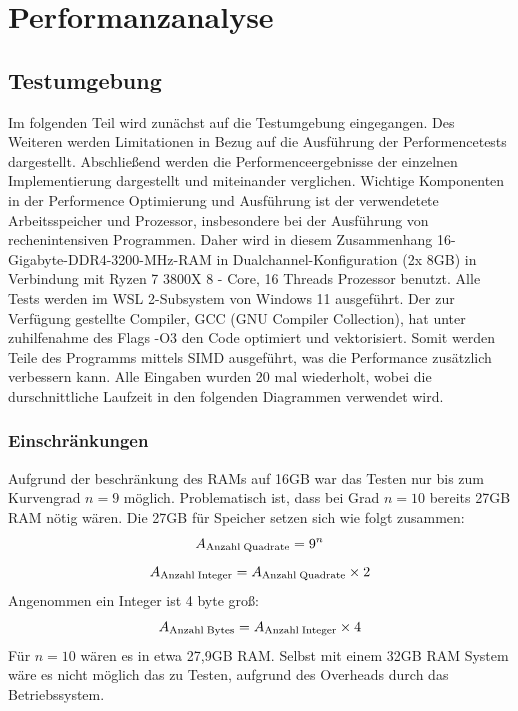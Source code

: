 \documentclass[course=erap]{aspdoc}
\begin{document}
\section{Performanzanalyse}

\subsection{Testumgebung}
Im folgenden Teil wird zunächst auf die Testumgebung eingegangen. Des Weiteren werden Limitationen in Bezug auf die Ausführung der Performencetests dargestellt. Abschließend werden die Performenceergebnisse der einzelnen Implementierung dargestellt und miteinander verglichen. Wichtige Komponenten in der Performence Optimierung und Ausführung ist der verwendetete Arbeitsspeicher und Prozessor, insbesondere bei der Ausführung von rechenintensiven Programmen. Daher wird in diesem Zusammenhang 16-Gigabyte-DDR4-3200-MHz-RAM in Dualchannel-Konfiguration (2x 8GB) in Verbindung mit Ryzen 7 3800X 8 - Core, 16 Threads Prozessor benutzt. Alle Tests werden im WSL 2-Subsystem von Windows 11 ausgeführt. Der zur Verfügung gestellte Compiler, GCC (GNU Compiler Collection), hat unter zuhilfenahme des Flags -O3 den Code optimiert und vektorisiert. Somit werden Teile des Programms mittels SIMD ausgeführt, was die Performance zusätzlich verbessern kann. Alle Eingaben wurden 20 mal wiederholt, wobei die durschnittliche Laufzeit in den folgenden Diagrammen verwendet wird.



\subsubsection{Einschränkungen}
Aufgrund der beschränkung des RAMs auf 16GB war das Testen nur bis zum Kurvengrad \(n = 9\) möglich. Problematisch ist, dass bei Grad \(n = 10\) bereits 27GB RAM nötig wären. Die 27GB für Speicher setzen sich wie folgt zusammen:\\
\begin{equation}
    A\textsubscript{Anzahl\;Quadrate} = 9^n
\end{equation}
\begin{equation}
    A\textsubscript{Anzahl\;Integer} = A\textsubscript{Anzahl\;Quadrate} \times 2
\end{equation}
Angenommen ein Integer ist 4 byte groß: \\
\begin{equation}
    A\textsubscript{Anzahl\;Bytes} = A\textsubscript{Anzahl\;Integer} \times 4
\end{equation}
Für \(n = 10\) wären es in etwa 27,9GB RAM. Selbst mit einem 32GB RAM System wäre es nicht möglich das zu Testen, aufgrund des Overheads durch das Betriebssystem.
\end{document}

